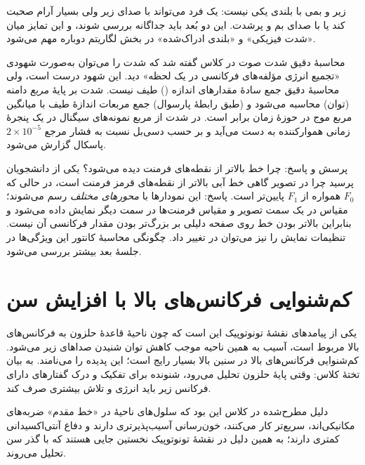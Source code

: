 زیر و بمی با بلندی یکی نیست: یک فرد می‌تواند با صدای زیر ولی بسیار آرام صحبت کند یا با صدای بم و پرشدت. این دو بُعد باید جداگانه بررسی شوند، و این تمایز میان «شدت فیزیکی» و «بلندی ادراک‌شده» در بخش لگاریتم دوباره مهم می‌شود.

\begin{correctionbox}{محاسبهٔ دقیق شدت صوت}
در کلاس گفته شد که شدت را می‌توان به‌صورت شهودی «تجمیع انرژی مؤلفه‌های فرکانسی در یک لحظه» دید. این شهود درست است، ولی محاسبهٔ دقیق جمع ساده‌ٔ مقدارهای اندازه () طیف نیست. شدت بر پایهٔ \emph{مربع} دامنه (توان) محاسبه می‌شود و (طبق رابطهٔ پارسوال) جمع مربعات اندازهٔ طیف با میانگین مربع موج در حوزهٔ زمان برابر است. در  شدت از مربع نمونه‌های سیگنال در یک پنجرهٔ زمانی هموارکننده به دست می‌آید و بر حسب دسی‌بل نسبت به فشار مرجع $2\times10^{-5}$ پاسکال گزارش می‌شود.
\end{correctionbox}

\begin{exambox}{پرسش و پاسخ: چرا خط  بالاتر از نقطه‌های فرمنت دیده می‌شود؟}
یکی از دانشجویان پرسید چرا در تصویر  گاهی خط آبی  بالاتر از نقطه‌های قرمز فرمنت است، در حالی که $F_0$ همواره از $F_1$ پایین‌تر است. پاسخ: این نمودارها با \emph{محورهای مختلف} رسم می‌شوند؛ مقیاس  در یک سمت تصویر و مقیاس فرمنت‌ها در سمت دیگر نمایش داده می‌شود و بنابراین بالاتر بودن خط روی صفحه دلیلی بر بزرگ‌تر بودن مقدار فرکانسی آن نیست. تنظیمات نمایش  را نیز می‌توان در  تغییر داد. چگونگی محاسبهٔ کانتور این ویژگی‌ها در جلسهٔ بعد بیشتر بررسی می‌شود.
\end{exambox}

\section{کم‌شنوایی فرکانس‌های بالا با افزایش سن}
\label{sec:presbycusis}

یکی از پیامدهای نقشهٔ تونوتوپیک این است که چون ناحیهٔ قاعدهٔ حلزون به فرکانس‌های بالا مربوط است، آسیب به همین ناحیه موجب کاهش توان شنیدن صداهای زیر می‌شود. کم‌شنوایی فرکانس‌های بالا در سنین بالا بسیار رایج است؛ این پدیده را  می‌نامند. به بیان تختهٔ کلاس: وقتی پایهٔ حلزون تحلیل می‌رود، شنونده برای تفکیک و درک گفتارهای دارای فرکانس زیر باید انرژی و تلاش بیشتری صرف کند.

دلیل مطرح‌شده در کلاس این بود که سلول‌های ناحیهٔ  در «خط مقدم» ضربه‌های مکانیکی‌اند، سریع‌تر کار می‌کنند، خون‌رسانی آسیب‌پذیرتری دارند و دفاع آنتی‌اکسیدانی کمتری دارند؛ به همین دلیل در نقشهٔ تونوتوپیک نخستین جایی هستند که با گذر سن تحلیل می‌روند.

